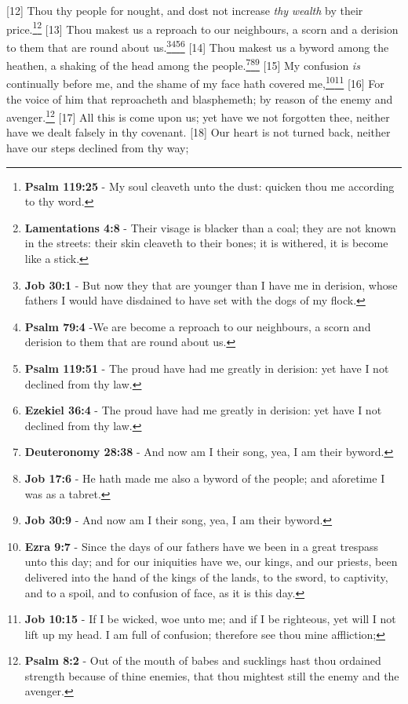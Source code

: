 [12] \textcolor[cmyk]{0.99998,1,0,0}{Thou  thy people for nought, and dost not increase \emph{thy} \emph{wealth} by their price.}\footnote{\textbf{Psalm 119:25} - My soul cleaveth unto the dust: quicken thou me according to thy word.}\footnote{\textbf{Lamentations 4:8} - Their visage is blacker than a coal; they are not known in the streets: their skin cleaveth to their bones; it is withered, it is become like a stick.}
[13] \textcolor[cmyk]{0.99998,1,0,0}{Thou makest us a reproach to our neighbours, a scorn and a derision to them that are round about us.}\footnote{\textbf{Job 30:1} - But now they that are younger than I have me in derision, whose fathers I would have disdained to have set with the dogs of my flock.}\footnote{\textbf{Psalm 79:4} -We are become a reproach to our neighbours, a scorn and derision to them that are round about us.}\footnote{\textbf{Psalm 119:51} - The proud have had me greatly in derision: yet have I not declined from thy law.}\footnote{\textbf{Ezekiel 36:4} - The proud have had me greatly in derision: yet have I not declined from thy law.}
[14] \textcolor[cmyk]{0.99998,1,0,0}{Thou makest us a byword among the heathen, a shaking of the head among the people.}\footnote{\textbf{Deuteronomy 28:38} - And now am I their song, yea, I am their byword.}\footnote{\textbf{Job 17:6} - He hath made me also a byword of the people; and aforetime I was as a tabret.}\footnote{\textbf{Job 30:9} - And now am I their song, yea, I am their byword.}
[15] \textcolor[cmyk]{0.99998,1,0,0}{My confusion \emph{is} continually before me, and the shame of my face hath covered me,}\footnote{\textbf{Ezra 9:7} - Since the days of our fathers have we been in a great trespass unto this day; and for our iniquities have we, our kings, and our priests, been delivered into the hand of the kings of the lands, to the sword, to captivity, and to a spoil, and to confusion of face, as it is this day.}\footnote{\textbf{Job 10:15} - If I be wicked, woe unto me; and if I be righteous, yet will I not lift up my head. I am full of confusion; therefore see thou mine affliction;}
[16] \textcolor[cmyk]{0.99998,1,0,0}{For the voice of him that reproacheth and blasphemeth; by reason of the enemy and avenger.}\footnote{\textbf{Psalm 8:2}  - Out of the mouth of babes and sucklings hast thou ordained strength because of thine enemies, that thou mightest still the enemy and the avenger.}
[17] \textcolor[cmyk]{0.99998,1,0,0}{All this is come upon us; yet have we not forgotten thee, neither have we dealt falsely in thy covenant.}
[18] \textcolor[cmyk]{0.99998,1,0,0}{Our heart is not turned back, neither have our steps declined from thy way;}
